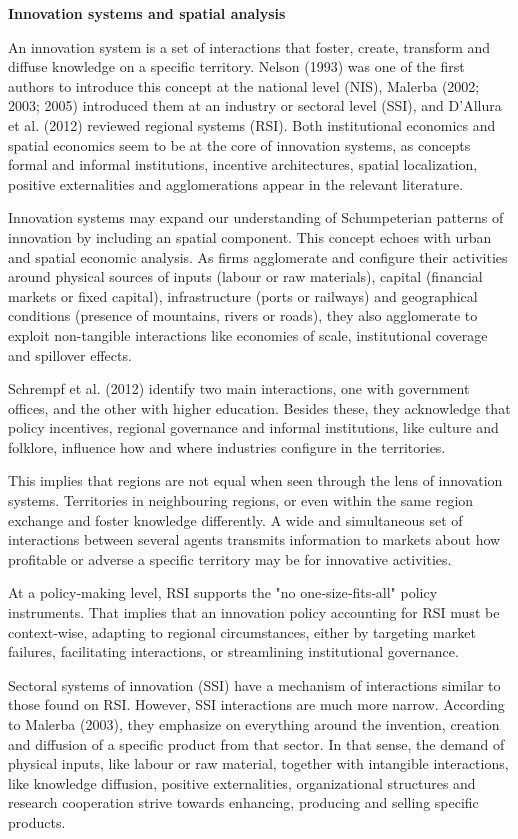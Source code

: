 \documentclass[12pt,a4paper]{article}
\begin{document}
\noindent \textbf{Innovation systems and spatial analysis}

An innovation system is a set of interactions that foster, create, transform and diffuse knowledge on a specific territory. Nelson (1993) was one of the first authors to introduce this concept at the national level (NIS), Malerba (2002; 2003; 2005) introduced them at an industry or sectoral level (SSI), and D’Allura et al. (2012) reviewed regional systems (RSI). Both institutional economics and spatial economics seem to be at the core of innovation systems, as concepts formal and informal institutions, incentive architectures, spatial localization, positive externalities and agglomerations appear in the relevant literature.

Innovation systems may expand our understanding of Schumpeterian patterns of innovation by including an spatial component. This concept echoes with urban and spatial economic analysis. As firms agglomerate and configure their activities around physical sources of inputs (labour or raw materials), capital (financial markets or fixed capital), infrastructure (ports or railways) and geographical conditions (presence of mountains, rivers or roads), they also agglomerate to exploit non-tangible interactions like economies of scale, institutional coverage and spillover effects. 

Schrempf et al. (2012) identify two main interactions, one with government offices, and the other with higher education. Besides these, they acknowledge that policy incentives, regional governance and informal institutions, like culture and folklore, influence how and where industries configure in the territories.

This implies that regions are not equal when seen through the lens of innovation systems. Territories in neighbouring regions, or even within the same region exchange and foster knowledge differently. A wide and simultaneous set of interactions between several agents transmits information to markets about how profitable or adverse a specific territory may be for innovative activities.

At a policy-making level, RSI supports the "no one‐size‐fits‐all" policy instruments. That implies that an innovation policy accounting for RSI must be context‐wise, adapting to regional circumstances, either by targeting market failures, facilitating interactions, or streamlining institutional governance. 

Sectoral systems of innovation (SSI) have a mechanism of interactions similar to those found on RSI. However, SSI interactions are much more narrow. According to Malerba (2003), they emphasize on everything around the invention, creation and diffusion of a specific product from that sector. In that sense, the demand of physical inputs, like labour or raw material, together with intangible interactions, like knowledge diffusion, positive externalities, organizational structures and research cooperation strive towards enhancing, producing and selling specific products. 
\end{document}
